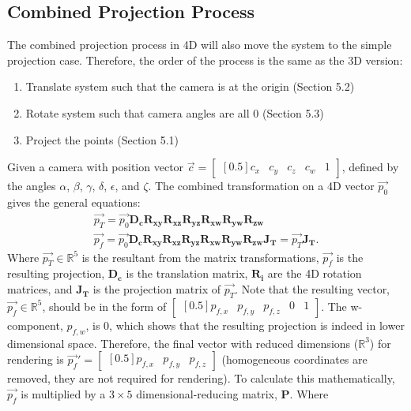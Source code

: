 \documentclass[12pt, letterpaper]{article}
\begin{document}
\subsection{Combined Projection Process}
The combined projection process in 4D will also move the system to the simple projection case. Therefore, the order of the process is the same as the 3D version:
\begin{enumerate}
  \item Translate system such that the camera is at the origin (Section 5.2)
  \item Rotate system such that camera angles are all 0 (Section 5.3)
  \item Project the points (Section 5.1)
\end{enumerate}
Given a camera with position vector $\vec{c} = \begin{bmatrix}[0.5] c_x & c_y & c_z& c_w & 1\end{bmatrix}$, defined by the angles $\alpha$, $\beta$, $\gamma$, $\delta$, $\epsilon$, and $\zeta$. The combined transformation on a 4D vector $\vec{p_0}$ gives the general equations:
\begin{equation}
    \begin{gathered}
\vec{p_T} = \vec{p_0} \mathbf{D_c}\mathbf{R_{xy}}\mathbf{R_{xz}}\mathbf{R_{yz}}\mathbf{R_{xw}}\mathbf{R_{yw}}\mathbf{R_{zw}}\\
\vec{p_f} = \vec{p_0} \mathbf{D_c}\mathbf{R_{xy}}\mathbf{R_{xz}}\mathbf{R_{yz}}\mathbf{R_{xw}}\mathbf{R_{yw}}\mathbf{R_{zw}}\mathbf{J_T} = \vec{p_T}\mathbf{J_T}.
    \end{gathered}
\end{equation}
Where $\vec{p_T} \in \mathbb{R}^5$ is the resultant from the matrix transformations, $\vec{p_f}$ is the resulting projection, $\mathbf{D_c}$ is the translation matrix, $\mathbf{R_{i}}$ are the 4D rotation matrices, and $\mathbf{J_T}$ is the projection matrix of $\vec{p_T}$. Note that the resulting vector, $\vec{p_f} \in \mathbb{R}^5$, should be in the form of $\begin{bmatrix}[0.5] p_{f,x} & p_{f,y} & p_{f,z} & 0 & 1\end{bmatrix}$. The w-component, $p_{f,w}$, is 0, which shows that the resulting projection is indeed in lower dimensional space. Therefore, the final vector with reduced dimensions ($\mathbb{R}^3$) for rendering is $\vec{p_f}' = \begin{bmatrix}[0.5] p_{f,x} & p_{f,y} & p_{f,z} \end{bmatrix}$ (homogeneous coordinates are removed, they are not required for rendering). To calculate this mathematically, $\vec{p_f}$ is multiplied by a $3 \times 5$ dimensional-reducing matrix, $\mathbf{P}$. Where
\end{document}
